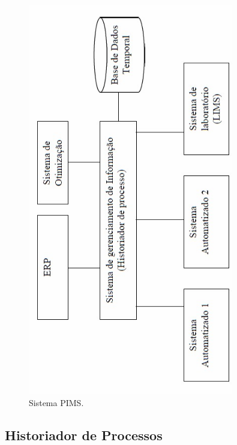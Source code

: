	\begin{figure}[hbt]
		\begin{center}
			\includegraphics[angle=-90,width=0.8\textwidth]{PIMS}
		\end{center}
		\caption{Sistema PIMS.}%
		\label{fig:PIMS}
	\end{figure}

\subsection{Historiador de Processos}

